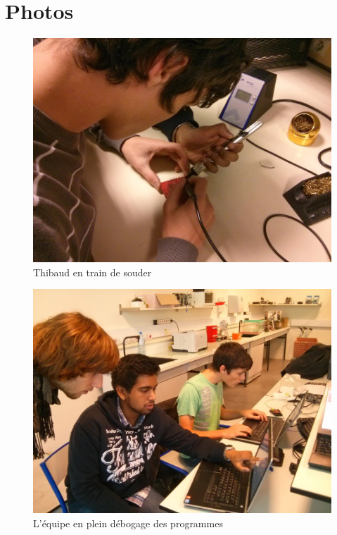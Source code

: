 \section{Photos}
\begin{figure}[h]
	\centering
	\includegraphics[scale=0.5]{images/soudage.jpg}
	\caption{Thibaud en train de souder}
\end{figure}

\begin{figure}[h]
	\centering
	\includegraphics[scale=0.5]{images/travailOrdinateurs.jpg}
	\caption{L'équipe en plein débogage des programmes}
\end{figure}